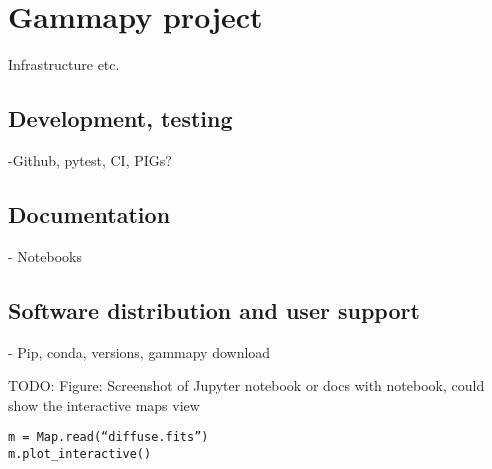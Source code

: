\section{Gammapy project}
\label{sec:project}

Infrastructure etc.

\subsection{Development, testing}

-Github, pytest, CI, PIGs?

\subsection{Documentation}

- Notebooks

\subsection{Software distribution and user support}

- Pip, conda, versions, gammapy download

TODO: Figure: Screenshot of Jupyter notebook or docs with notebook, could show the interactive maps view
\begin{verbatim}
m = Map.read(“diffuse.fits”)
m.plot_interactive()        
\end{verbatim}
